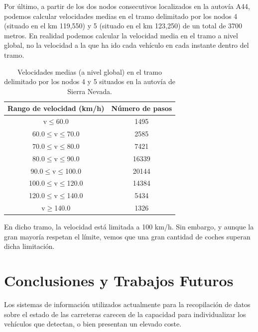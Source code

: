 \documentclass[twocolumn,twoside]{Jornadas}
\begin{document}
Por último, a partir de los dos nodos consecutivos localizados en la autovía A44, podemos calcular velocidades medias en el tramo delimitado por los nodos 4 (situado en el km 119,550) 
y 5 (situado en el km 123,250) de un total de 3700 metros. 
En realidad podemos calcular la velocidad media en el tramo a nivel global, no la velocidad a la que ha ido cada vehículo en cada instante dentro del tramo.

 \begin{table}
 \caption{Velocidades medias (a nivel global) en el tramo delimitado por los nodos 4 y 5 situados en la autovía de Sierra Nevada.
 \label{velocidad}}
 \begin{center}
 \begin{tabular}{|c|c|}
 \hline
Rango de velocidad (km/h) &  Número de pasos  \\
 \hline
v$\leq$60.0	& 1495  \\
 \hline
60.0$\leq$v$\leq$70.0 & 2585  \\
 \hline
70.0$\leq$v$\leq$80.0 & 7421  \\
 \hline
80.0$\leq$v$\leq$90.0 & 16339  \\
 \hline
90.0$\leq$v$\leq$100.0 & 20144  \\
 \hline
100.0$\leq$v$\leq$120.0 & 14384  \\
 \hline
120.0$\leq$v$\leq$140.0 & 5434  \\
 \hline
v$\geq$140.0 & 1326  \\
 \hline
 \end{tabular}
 \end{center}
 \end{table}


En dicho tramo, la velocidad está limitada a 100 km/h. Sin embargo, y aunque la gran mayoría respetan el límite, vemos que una gran cantidad de coches superan dicha limitación.



\section{Conclusiones y Trabajos Futuros}
\label{conclus}


Los sistemas de información utilizados actualmente para la recopilación de datos sobre el estado de las carreteras carecen de la capacidad para individualizar los vehículos que detectan, o bien presentan un elevado coste.
\end{document}
